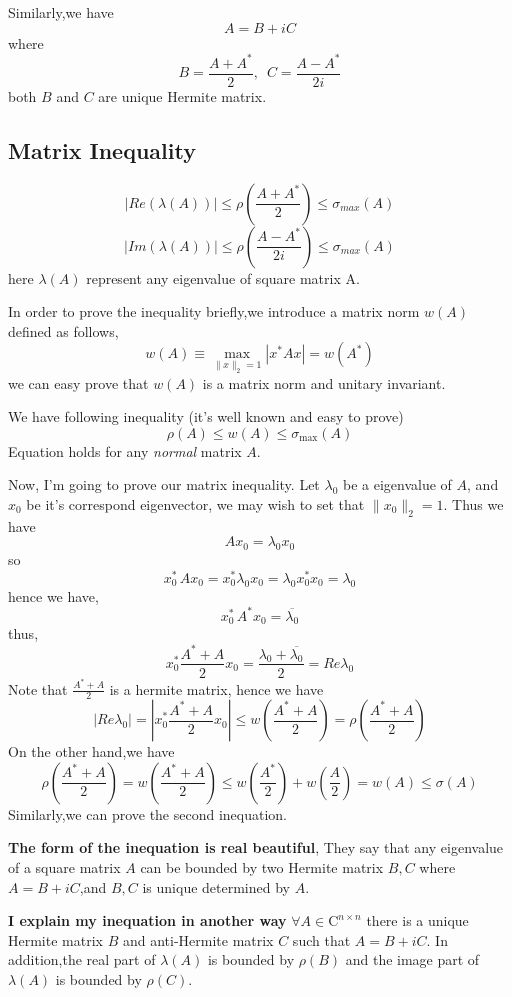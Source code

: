 \documentclass[a4paper,12pt]{article}
\begin{document}
Similarly,we have 
\[ A = B + iC \]
where
\[ B = \frac{A + A^*}{2} ,\,\,\, C = \frac{A - A^*}{2i} \]
both $B$ and $C$ are unique Hermite matrix.

\subsection*{Matrix Inequality}

\[ |Re(\lambda(A))| \leq \rho(\frac{A+A^*}{2}) \leq \sigma_{max}(A) \] 
\[ |Im(\lambda(A))| \leq \rho(\frac{A-A^*}{2i}) \leq \sigma_{max}(A) \] 
here $\lambda(A)$ represent any eigenvalue of square matrix A.

In order to prove the inequality briefly,we introduce a matrix norm $w(A)$ defined as follows,
\[ w(A) \equiv \max_{\|x\|_2 = 1} |x^*Ax| = w(A^*) \]
we can easy prove that $w(A)$ is a matrix norm and unitary invariant.

We have following inequality (it's well known and easy to prove)
\[ \rho(A) \leq w(A) \leq \sigma_{\max}(A) \]
Equation holds for any \textit{normal} matrix $A$.

Now, I'm going to prove our matrix inequality.\newline
Let $\lambda_0$ be a eigenvalue of $A$, and $x_0$ be it's correspond eigenvector, we may wish to set that $\|x_0\|_2 = 1$. Thus we have
\[ A x_0 = \lambda_0 x_0 \]
so 
\[ x_0^* \, A x_0 = x_0^* \lambda_0 x_0 = \lambda_0 x_0^* x_0 = \lambda_0 \]
hence we have,
\[ x_0^* \, A^* x_0 = \overline{\lambda_0} \]
thus,
\[ x_0^* \frac{A^* + A}{2} x_0 = \frac{\lambda_0 + \overline{\lambda_0}}{2} = Re{\lambda_0} \]
Note that $\frac{A^* + A}{2}$ is a hermite matrix, hence we have 
\[ |Re{\lambda_0}|= |x_0^* \frac{A^* + A}{2} x_0| \leq w(\frac{A^* + A}{2}) = \rho(\frac{A^* + A}{2}) \]
On the other hand,we have 
\[ \rho(\frac{A^* + A}{2}) = w(\frac{A^* + A}{2}) \leq w(\frac{A^*}{2}) + w(\frac{A}{2}) = w(A) \leq \sigma(A) \]
Similarly,we can prove the second inequation.

\textbf{The form of the inequation is real beautiful}, They say that any eigenvalue of a square matrix $A$ can be bounded by two Hermite matrix $B,C$ where $A=B+iC$,and $B,C$ is unique determined by $A$.

\textbf{I explain my inequation in another way}\newline
$\forall A \in \mathrm{C}^{n \times n}$ there is a unique Hermite matrix $B$ and anti-Hermite matrix $C$ such that $A=B+iC$. In addition,the real part of $\lambda(A)$ is bounded by $\rho(B)$ and the image part of $\lambda(A)$ is bounded by $\rho(C)$.
\end{document}

